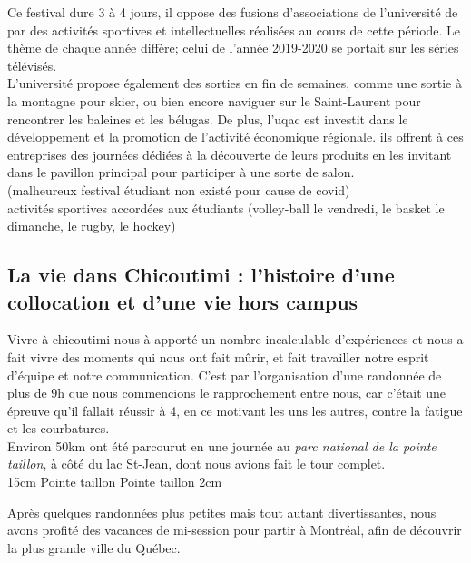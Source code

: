 Ce festival dure 3 à 4 jours, il oppose des fusions d'associations de l'université de par des activités sportives et intellectuelles réalisées au cours de cette période. Le thème de chaque année diffère; celui de l'année 2019-2020 se portait sur les séries télévisés.\\

L'université propose également des sorties en fin de semaines, comme une sortie à la montagne pour
skier, ou bien encore naviguer sur le Saint-Laurent pour rencontrer les baleines et les bélugas.
De plus, l'uqac est investit dans le développement et la promotion de l'activité économique régionale. ils offrent à ces entreprises des journées dédiées à la découverte de leurs produits en les invitant dans le pavillon principal pour participer à une sorte de salon.\\

(malheureux festival étudiant non existé pour cause de covid)\\
activités sportives accordées aux étudiants (volley-ball le vendredi, le basket le dimanche, le rugby, le hockey)


\subsection{La vie dans Chicoutimi : l'histoire d'une collocation et d'une vie hors campus}

Vivre à chicoutimi nous à apporté un nombre incalculable d'expériences et nous a fait vivre des moments qui nous ont fait mûrir, et fait travailler notre esprit d'équipe et notre communication.
C'est par l'organisation d'une randonnée de plus de 9h que nous commencions le rapprochement entre nous, car c'était une épreuve qu'il fallait réussir à 4, en ce motivant les uns les autres, contre la fatigue et les courbatures.\\
Environ 50km ont été parcourut en une journée au \textit{parc national de la pointe taillon}, à côté du lac St-Jean, dont nous avions fait le tour complet.\\

{15cm}
{Pointe taillon}
{Pointe taillon}
{2cm}

Après quelques randonnées plus petites mais tout autant divertissantes, nous avons profité des vacances de mi-session pour partir à Montréal, afin de découvrir la plus grande ville du Québec.\\


